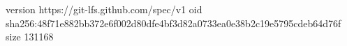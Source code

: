 version https://git-lfs.github.com/spec/v1
oid sha256:48f71e882bb372e6f002d80dfe4bf3d82a0733ea0e38b2c19e5795cdeb64d76f
size 131168
